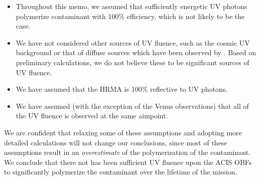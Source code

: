 \documentclass[11pt]{article}
\begin{document}
\begin{itemize}
\item Throughout this memo, we assumed that sufficiently energetic UV photons polymerize contaminant with 100\% efficiency, which is not likely to be the case.
\item We have not considered other sources of UV fluence, such as the cosmic UV background or that of diffuse sources which have been observed by \chandra. Based on preliminary calculations, we do not believe these to be significant sources of UV fluence.
\item We have assumed that the HRMA is 100\% reflective to UV photons.
\item We have assumed (with the exception of the Venus observations) that all of the UV fluence is observed at the
same aimpoint.
\end{itemize}

We are confident that relaxing some of these assumptions and adopting more detailed calculations will not change our conclusions, since most of these assumptions result in an {\it overestimate} of the polymerization of the contaminant. We conclude that there not has been sufficient UV fluence upon the ACIS OBFs to significantly polymerize the contaminant over the lifetime of the mission.
\end{document}
